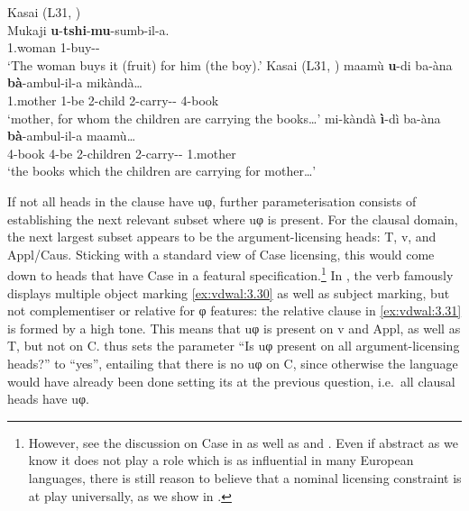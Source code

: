\documentclass[output=paper]{langsci/langscibook}
\begin{document}
\ea\label{ex:vdwal:3.28}  Kasai (L31, \citealt[87]{Cocchi2000})\label{bkm:Ref345186241}\\
    \gll Mukaji  \textbf{u}{}-\textbf{tshi}{}-\textbf{mu}{}-sumb-il-a.\\
          1.woman  1\Om{}-buy-\Appl{}{}-\Fv{}\\
    \glt      `The woman buys it (fruit) for him (the boy).’
\ex\label{ex:vdwal:3.29}  Kasai (L31, \citealt[104]{deKindBostoen2012}) \label{bkm:Ref345186270}
	\ea
	\gll	 maamù  \textbf{u}{}-di  ba-àna  \textbf{bà}{}-ambul-il-a  mikàndà…\\
	    1.mother  1\Rm{}-be  2-child  2\Sm{}-carry-\Appl{}{}-\Fv{}  4-book\\
	\glt    ‘mother, for whom the children are carrying the books…’
	\ex
	\gll	 mi-kàndà  \textbf{ì}{}-dì  ba-àna  \textbf{bà}{}-ambul-il-a  maamù…\\
	    4-book  4\Rm{}-be  2-children  2\Sm{}-carry-\Appl{}{}-\Fv{}  1.mother\\
	\glt    ‘the books which the children are carrying for mother…’
	\z
\z

If not all heads in the clause have uφ, further parameterisation consists of
establishing the next relevant subset where uφ is present. For the 
clausal domain, the next largest subset appears to be the argument-licensing
heads: T, v, and Appl/Caus. Sticking with a standard view of Case
licensing,
this would come down to heads that have
Case in a featural specification.\footnote{However, see the discussion on Case in 
    as well as \citet{Diercks2012} and
    \textcite{vanderWal2015}. Even if abstract  as we know it does
not play a role which is as influential in many European languages, there is
still reason to believe that a nominal licensing constraint is at play
universally, as we show in \textcite{SheevanderWal2016,SheevanderWal2018}.} In
, the verb famously displays multiple object marking
\eqref{ex:vdwal:3.30} as well as subject marking, but not complementiser or
relative  for φ features: the relative clause in
\eqref{ex:vdwal:3.31} is formed by a high tone. This means that uφ is
present on v and Appl, as well as T, but not on C.   thus sets
the parameter \enquote{Is uφ present on all argument-licensing heads?} to
\enquote{yes}, entailing that there is no uφ on C, since otherwise the language
would have already been done setting its  at the previous
question, i.e.\ all clausal heads have uφ.
\end{document}
